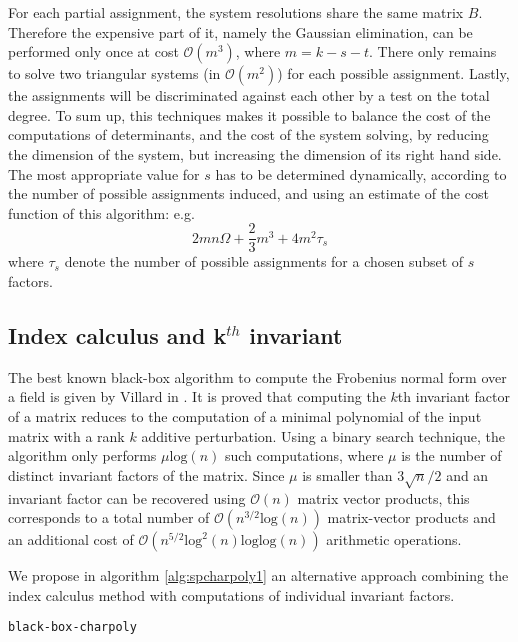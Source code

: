 \documentclass{article}
\newcommand{\GO}{\mathcal{ O}}
\newcommand{\charpoly}{{P_\text{char}^A}}
\begin{document}
For each partial assignment, the system resolutions share the same matrix
$B$. Therefore the expensive part of it, namely the Gaussian elimination, can be
performed only once  at cost $\GO(m^3)$, where $m=k-s-t$.
There only remains to solve two triangular systems (in $\GO(m^2)$)
for each possible assignment. 
Lastly, the assignments will be discriminated against each other by a test on
the total degree. 
To sum up, this techniques makes it possible to balance the cost of the
computations of determinants, and the cost of the system solving, by
reducing the dimension of the system, but increasing the dimension of its right
hand side.
The most appropriate value for $s$ has to be determined dynamically, according
to the number of possible assignments induced, and using an estimate of the cost
function of this algorithm: e.g.
$$2mn\Omega+\frac{2}{3}m^3+4m^2 \tau_s$$
where $\tau_s$ denote the number of possible assignments for a chosen subset of
$s$ factors.











\subsection{Index calculus and k$^{th}$ invariant}

The best known black-box algorithm to compute the Frobenius normal form over a
field is given by Villard in \cite{Villard:2000:Frob}. It is proved that computing the
$k$th invariant factor of a matrix reduces to the computation of a minimal
polynomial of the input matrix with a rank $k$ additive perturbation.
Using a binary search technique, the algorithm only performs $\mu\text{log}(n)$
such computations, where $\mu$ is the number of distinct invariant factors of the matrix.
Since $\mu$ is smaller than $3\sqrt{n}/2$ and  an invariant factor can
be recovered using $\GO(n)$ matrix vector products, this corresponds
to a total number of $\GO(n^{3/2}\text{log}(n))$ matrix-vector products and an
additional cost of $\GO(n^{5/2}\text{log}^2(n)\text{loglog}(n))$ arithmetic
operations.

We propose in algorithm \ref{alg:spcharpoly1} an alternative approach combining
the index calculus method with computations of individual
invariant factors. 

\begin{algorithm}
  \dontprintsemicolon
  \caption{\texttt{black-box-charpoly} \label{alg:spcharpoly1}}
  \KwResult{$\charpoly$  or ``fail"}
\end{algorithm}
\end{document}
